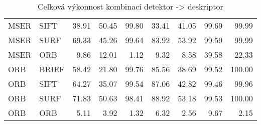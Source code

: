 \begin{table}[htbp]
\begin{tabular}{ l l| r r r r r r r }
	 MSER &  SIFT & 38.91 & 50.45 & 99.80 & 33.41 & 41.05 & 99.69 & 99.99 \\
	 MSER &  SURF & 69.33 & 45.26 & 99.64 & 83.92 & 53.92 & 99.59 & 99.99 \\
	 MSER &  ORB & 9.86 & 12.01 & 1.12 & 9.32 & 8.58 & 39.58 & 22.33 \\
	 ORB &  BRIEF & 58.42 & 21.80 & 99.76 & 85.56 & 38.69 & 99.52 & 100.00 \\
	 ORB &  SIFT & 64.27 & 35.07 & 99.54 & 87.06 & 42.82 & 99.46 & 99.96 \\
	 ORB &  SURF & 71.83 & 50.63 & 98.41 & 88.92 & 53.18 & 99.53 & 100.00 \\
	 ORB &  ORB & 5.11 & 3.92 & 1.32 & 6.32 & 2.56 & 9.67 & 2.15
\end{tabular}
	\caption[Short Heading]{\protect Celková výkonnost kombinací detektor -> deskriptor}\label{tab_comboperf}
\end{table}
